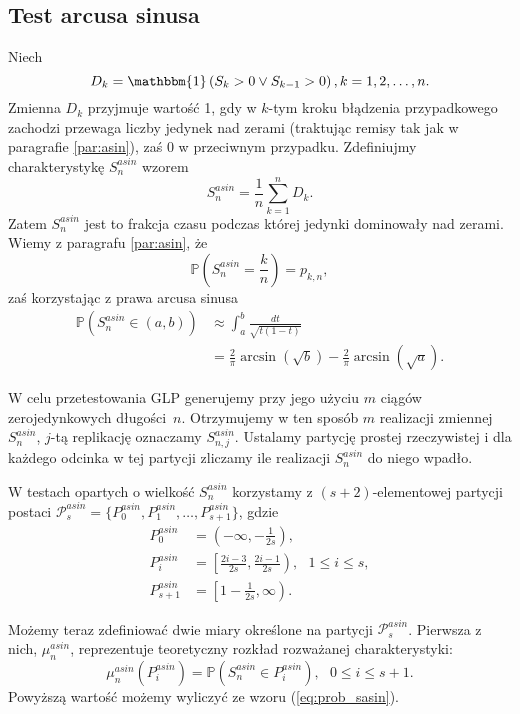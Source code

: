 \documentclass[a4paper,11pt,twoside]{book}
\newcommand{\Pro}[1]{\mathbb{P}\left(#1\right)}
\newcommand{\Sasin}[1]{S^{asin}_#1}
\theoremstyle{definition}
\begin{document}
\subsection{Test arcusa sinusa}
Niech
\begin{equation}
D_k = \mathbbm{1}\left(S_k > 0 \vee S_{k-1}>0 \right), k=1,2,\ldots,n.
\end{equation}
Zmienna $D_k$ przyjmuje wartość 1, gdy w $k$-tym kroku błądzenia przypadkowego zachodzi przewaga liczby jedynek nad zerami (traktując remisy tak jak w paragrafie \ref{par:asin}), zaś 0 w przeciwnym przypadku. Zdefiniujmy charakterystykę $\Sasin{n}$ wzorem
\begin{equation}
 \Sasin{n} = \frac{1}{n} \sum_{k=1}^n D_k.
\end{equation}
Zatem $\Sasin{n}$ jest to frakcja czasu podczas której jedynki dominowały nad zerami. Wiemy z paragrafu \ref{par:asin}, że
\[ \Pro{\Sasin{n} = \frac{k}{n}} = p_{k,n}, \]
zaś korzystając z prawa arcusa sinusa
\begin{equation}
\begin{split}
 \label{eq:prob_sasin}
  \Pro{\Sasin{n} \in (a,b)} &\approx \int_a^b \frac{dt}{\sqrt{t(1-t)}}\\
  &= \frac{2}{\pi}\arcsin(\sqrt{b}) - \frac{2}{\pi}\arcsin(\sqrt{a}).
\end{split}
\end{equation}

W celu przetestowania GLP generujemy przy jego użyciu $m$ ciągów zerojedynkowych długości~$n$. Otrzymujemy w ten sposób $m$ realizacji zmiennej $\Sasin{n}$, $j$-tą replikację oznaczamy $\Sasin{{n,j}}$. Ustalamy partycję prostej rzeczywistej i dla każdego odcinka w tej partycji zliczamy ile realizacji $\Sasin{n}$ do niego wpadło.

W testach opartych o wielkość $\Sasin{n}$ korzystamy z $(s+2)$-elementowej partycji postaci $\mathcal{P}^{asin}_s = \{ P^{asin}_0, P^{asin}_1, \ldots, P^{asin}_{s+1}\}$, gdzie
\begin{equation*}
\begin{split}
  P^{asin}_0 &= \left(-\infty, -\frac{1}{2s}\right),\\
  P^{asin}_i &= \left[\frac{2i-3}{2s}, \frac{2i-1}{2s} \right),\ \ \ 1 \leq i \leq s,\\
  P^{asin}_{s+1} &= \left[1- \frac{1}{2s}, \infty\right).
\end{split}
\end{equation*}

Możemy teraz zdefiniować dwie miary określone na partycji  $\mathcal{P}^{asin}_s$. Pierwsza z nich, $ \mu^{asin}_n$, reprezentuje teoretyczny rozkład rozważanej charakterystyki:
\begin{equation}
\label{eq:mu_asin}
 \mu^{asin}_n \left( P^{asin}_i \right) = \Pro{\Sasin{n} \in P^{asin}_i},\ \ \ 0 \leq i \leq s+1.
\end{equation}
Powyższą wartość możemy wyliczyć ze wzoru (\ref{eq:prob_sasin}).
\end{document}
